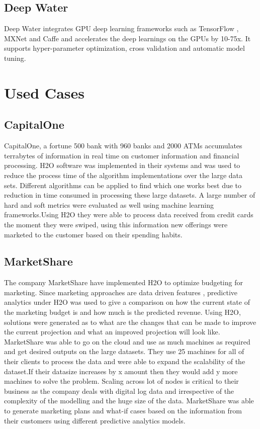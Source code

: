 \documentclass[9pt,twocolumn,twoside]{../../styles/osajnl}
\begin{document}
\subsection{Deep Water}
Deep Water integrates GPU deep learning frameworks such as TensorFlow , MXNet and Caffe and accelerates the deep learnings on the GPUs by 10-75x. It supports hyper-parameter optimization, cross validation and automatic model tuning\cite{www-h2o-deepwater}.

\section {Used Cases}


\subsection {CapitalOne}

CapitalOne, a fortune 500 bank with 960 banks and 2000 ATMs
accumulates terrabytes of information in real time on customer
information and financial processing. H2O software was implemented in their systems and  was used to reduce the
process time of the algorithm implementations over the large data sets\cite{www-h2o-capitalone}. Different algorithms can be applied to find which one
works best due to reduction in time consumed in processing these large
datasets. A large number of hard and soft metrics were evaluated as
well using machine learning frameworks\cite{www-h2o-capitalone}.Using H2O they were able to process data received from credit cards the moment they were swiped, using this information new offerings were marketed to the customer based on their spending habits.


\subsection {MarketShare}

The company MarketShare have implemented H2O to optimize budgeting for
marketing. Since marketing approaches are data driven features ,
predictive analytics under H2O was used to give a comparison on how
the current state of the marketing budget is and how much is the
predicted revenue\cite{www-h2o-marketshare}. Using H2O, solutions were generated as to what are
the changes that can be made to improve the current projection and
what an improved projection will look like. MarketShare was able to go on the cloud and use as much
machines as required and get desired outputs on the large
datasets. They use 25 machines for all of their clients to process the
data and were able to expand the scalability of the dataset.If their
datasize increases by x amount then they would add y more machines to
solve the problem\cite{www-h2o-marketshare}. Scaling across lot of nodes is critical to their
business as the company deals with digital log data and irrespective
of the complexity of the modelling and the huge size of the data\cite{www-h2o-marketshare}. MarketShare was able to generate marketing plans and what-if cases based on the information from their customers using different predictive analytics models.
\end{document}
